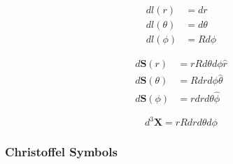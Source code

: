 \begin{align}
dl\left( r\right) & =dr \\
dl\left( \theta\right) & =d\theta \\
dl\left( \phi\right) & =Rd\phi
\end{align}

\begin{align}
d\mathbf{S}\left( r\right) & =rRd\theta d\phi\widehat{r} \\
d\mathbf{S}\left( \theta\right) & =Rdrd\phi\widehat{\theta} \\
d\mathbf{S}\left( \phi\right) & =rdrd\theta\widehat{\phi}
\end{align}

\begin{equation}
d^{3}\mathbf{X}=rRdrd\theta d\phi
\end{equation}

\subsubsection{Christoffel Symbols}

